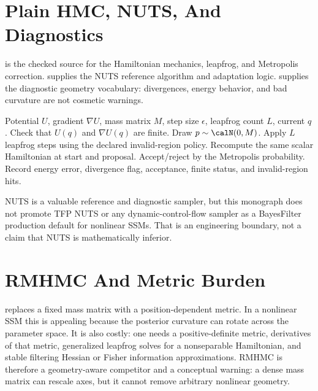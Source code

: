 \section{Plain HMC, NUTS, And Diagnostics}
\label{sec:bf-hd-hmc-diagnostics}

\citet{neal2011mcmc} is the checked source for the Hamiltonian mechanics,
leapfrog, and Metropolis correction.  \citet{hoffman2014nuts} supplies the NUTS
reference algorithm and adaptation logic.  \citet{betancourt2017conceptual}
supplies the diagnostic geometry vocabulary: divergences, energy behavior, and
bad curvature are not cosmetic warnings.

\begin{algorithm}
\caption{Fixed-trajectory HMC diagnostic kernel}
\label{alg:bf-hd-fixed-hmc}
\begin{algorithmic}[1]
\Require Potential $U$, gradient $\nabla U$, mass matrix $M$, step size
  $\epsilon$, leapfrog count $L$, current $q$.
\State Check that $U(q)$ and $\nabla U(q)$ are finite.
\State Draw $p\sim\calN(0,M)$.
\State Apply $L$ leapfrog steps using the declared invalid-region policy.
\State Recompute the same scalar Hamiltonian at start and proposal.
\State Accept/reject by the Metropolis probability.
\State Record energy error, divergence flag, acceptance, finite status, and
  invalid-region hits.
\end{algorithmic}
\end{algorithm}

NUTS is a valuable reference and diagnostic sampler, but this monograph does
not promote TFP NUTS or any dynamic-control-flow sampler as a BayesFilter
production default for nonlinear SSMs.  That is an engineering boundary, not a
claim that NUTS is mathematically inferior.

\section{RMHMC And Metric Burden}
\label{sec:bf-hd-rmhmc}

\citet{girolami2011riemann} replaces a fixed mass matrix with a
position-dependent metric.  In a nonlinear SSM this is appealing because the
posterior curvature can rotate across the parameter space.  It is also costly:
one needs a positive-definite metric, derivatives of that metric, generalized
leapfrog solves for a nonseparable Hamiltonian, and stable filtering Hessian or
Fisher information approximations.  RMHMC is therefore a geometry-aware
competitor and a conceptual warning: a dense mass matrix can rescale axes, but
it cannot remove arbitrary nonlinear geometry.


